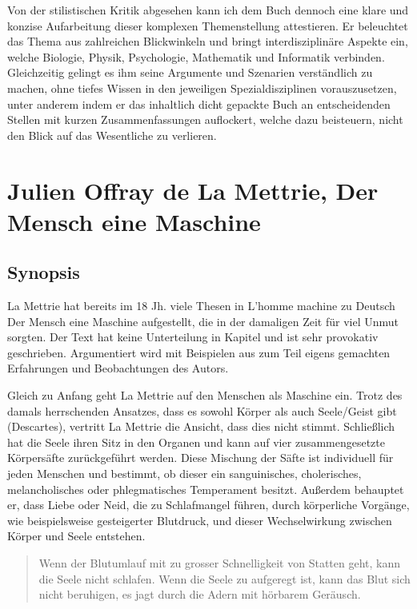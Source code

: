 \documentclass[twoside, a4paper, DIV=11, open=any, bibliography=totoc]{scrbook}
\newcommand{\Quote}[1]{\glqq #1\grqq{}}
\begin{document}
Von der stilistischen Kritik abgesehen kann ich dem Buch dennoch eine klare
und konzise Aufarbeitung dieser komplexen Themenstellung attestieren. Er beleuchtet
das Thema aus zahlreichen Blickwinkeln und bringt interdisziplinäre Aspekte ein,
welche Biologie, Physik, Psychologie, Mathematik und Informatik verbinden.
Gleichzeitig gelingt es ihm seine Argumente und Szenarien verständlich zu machen,
ohne tiefes Wissen in den jeweiligen Spezialdisziplinen vorauszusetzen, unter anderem indem
er das inhaltlich dicht gepackte Buch an entscheidenden Stellen mit kurzen
Zusammenfassungen auflockert, welche dazu beisteuern, nicht den Blick auf das
Wesentliche zu verlieren.


\section{Julien Offray de La Mettrie, Der Mensch eine Maschine} \label{sec:litb2}
\subsection{Synopsis} \label{sec:litsynops2}
La Mettrie hat bereits im 18 Jh. viele Thesen in \Quote{L'homme machine} zu Deutsch \Quote{Der Mensch eine Maschine} aufgestellt, die in der damaligen Zeit für viel Unmut sorgten. Der Text hat keine Unterteilung in Kapitel und ist sehr provokativ geschrieben. Argumentiert wird mit Beispielen aus zum Teil eigens gemachten Erfahrungen und Beobachtungen des Autors.  
\par
Gleich zu Anfang geht La Mettrie auf den Menschen als Maschine ein. Trotz des damals herrschenden Ansatzes, dass es sowohl Körper als auch Seele/Geist gibt (Descartes), vertritt La Mettrie die Ansicht, dass dies nicht stimmt. Schließlich hat die Seele ihren Sitz in den Organen und kann auf vier zusammengesetzte Körpersäfte zurückgeführt werden. Diese Mischung der Säfte ist individuell für jeden Menschen und bestimmt, ob dieser ein sanguinisches, cholerisches, melancholisches oder phlegmatisches Temperament besitzt. Außerdem behauptet er, dass Liebe oder Neid, die zu Schlafmangel führen, durch körperliche Vorgänge, wie beispielsweise gesteigerter Blutdruck, und dieser Wechselwirkung zwischen Körper und Seele entstehen.  

\begin{quote}
   \Quote{Wenn der Blutumlauf mit zu grosser Schnelligkeit von Statten geht, kann die Seele nicht schlafen. Wenn die Seele zu aufgeregt ist, kann das Blut sich nicht beruhigen, es jagt durch die Adern mit hörbarem Geräusch.}
\end{quote}
\end{document}
